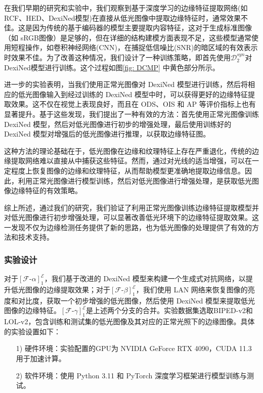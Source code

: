 \documentclass[a4paper]{ctexart}
\begin{document}
	在我们早期的研究和实验中，我们观察到基于深度学习的边缘特征提取网络(如RCF、HED、DexiNed模型)在直接从低光图像中提取边缘特征时，通常效果不佳。这是因为传统的基于编码器的模型主要提取内容特征，这对于生成标准图像（如 sRGB图像）是足够的，但在详细的结构建模方面表现不足，这些模型通常使用短程操作，如卷积神经网络(CNN)，在捕捉低信噪比(SNR)的暗区域的有效表示时效果不佳。为了改善这种情况，我们设计了一种训练策略，即首先使用$\mathcal{D}^{syn}_2$对DexiNed模型进行训练。这个过程如图\ref{fig: DCMP} 中黄色部分所示。
	
	进一步的实验表明，当我们使用正常光图像对 DexiNed 模型进行训练，然后将相应的低光图像输入到经过训练的 DexiNed 模型中时，可以获得更好的边缘特征提取效果。这不仅在视觉上表现良好，而且在 ODS、OIS 和 AP 等评价指标上也有显著提升。基于这些发现，我们提出了一种有效的方法：首先使用正常光图像训练 DexiNed 模型，然后对低光图像进行初步的增强处理，最后使用训练好的 DexiNed 模型对增强后的低光图像进行推理，以获取边缘特征图。
	
	这种方法的理论基础在于，低光图像在边缘和纹理特征上存在严重退化，传统的边缘提取网络难以直接从中捕获这些特征。然而，通过对光线的适当增强，可以在一定程度上恢复图像的边缘和纹理特征，从而帮助模型更准确地提取边缘信息。因此，利用正常光图像进行模型训练，然后对低光图像进行增强处理，是获取低光图像边缘特征的有效策略。
	
	综上所述，通过我们的研究，我们验证了利用正常光图像训练边缘特征提取模型并对低光图像进行初步增强处理，可以显著改善低光环境下的边缘特征提取效果。这一发现不仅为边缘检测任务提供了新的思路，也为低光图像的处理提供了有效的方法和技术支持。
	
	\subsubsection{实验设计}
	
	对于${\left[\mathcal{F}\text{-}\alpha\right]}^{\mathcal{E}}_1$，我们基于改进的 DexiNed 模型来构建一个生成式对抗网络，以提升低光图像的边缘提取效果；对于${\left[\mathcal{F}\text{-}\beta\right]}^{\mathcal{E}}_1$，我们使用 LAN 网络来恢复图像的亮度和对比度，获取一个初步增强的低光图像，然后使用 DexiNed 模型来提取低光图像的边缘特征。${\left[\mathcal{F}\text{-}\gamma\right]}^{\mathcal{E}}_1$是上述两个分支的合并。实验数据集选取BIPED-v2和LOL-v2，包含训练和测试集的低光图像及其对应的正常光照下的边缘图像。具体的实验设置如下：
	
	\begin{itemize}
		\item[1)]
		硬件环境：实验配置的GPU为 NVIDIA GeForce RTX 4090，CUDA 11.3 用于加速计算。
		\item[2)]
		软件环境：使用 Python 3.11 和 PyTorch 深度学习框架进行模型训练与测试。
	\end{itemize}
	
\end{document}
